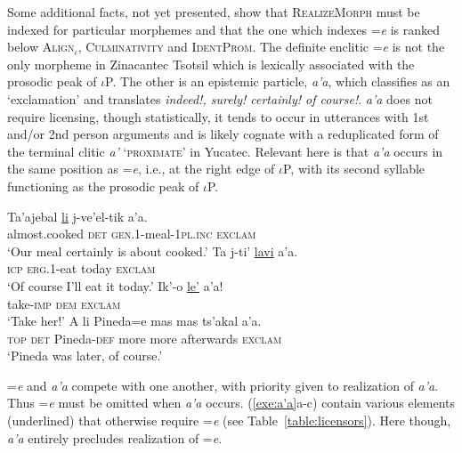 \documentclass[output=paper,
modfonts
]{LSP/langsci}
\begin{document}
Some additional facts, not yet presented, show that \textsc{RealizeMorph} must be indexed for particular morphemes and that
the one which indexes =\emph{e} is ranked below \textsc{Align$_{\iota}$}, \textsc{Culminativity} and  \textsc{IdentProm}.
The definite enclitic  =\emph{e} is
not the only morpheme in Zinacantec Tsotsil which is lexically associated with the prosodic peak of $\iota$P. 
The other is an epistemic particle, \emph{a'a}, which \citet{laughlin1975}
classifies as an `exclamation' and translates  \emph{indeed!, surely! certainly! of course!}. \emph{a'a} does not require licensing, though statistically, it tends to occur in utterances with 1st and/or 2nd person arguments and is likely cognate
with a reduplicated form of the terminal clitic \emph{a'} \textsc{`proximate'} in Yucatec.  
Relevant here is that \emph{a'a} occurs in the same position as =\emph{e}, i.e., at the right edge of
$\iota$P, with its second syllable functioning as the prosodic peak of $\iota$P. 
\begin{exe}
\ex
\begin{xlist}
\gll Ta'ajebal \underline{li} j-ve'el-tik a'a. \\
almost.cooked \textsc{det} \textsc{gen.1}-meal-\textsc{1pl.inc} \textsc{exclam} \\
\glt `Our meal certainly is about cooked.' \citep[285]{laughlin1977}
\gll Ta j-ti' \underline{lavi}  a'a.\\
\textsc{icp} \textsc{erg.1}-eat today \textsc{exclam}   \\
\glt  `Of course I'll eat it today.' \citep[283]{laughlin1977}
\gll Ik'-o \underline{le'} a'a! \\
take-\textsc{imp} \textsc{dem} \textsc{exclam} \\
\glt `Take her!' \citep[126]{laughlin1977}
\gll  A li Pineda=e mas mas ts'akal a'a. \\
\textsc{top} \textsc{det} Pineda-\textsc{def} more more afterwards  \textsc{exclam} \\
\glt `Pineda was later, of course.' \citep[116]{laughlin1977} 
\end{xlist}
\label{exe:a'a}
\end{exe}
=\emph{e} and \emph{a'a} compete
with one another, with priority given to realization of \emph{a'a}. Thus =\emph{e} must be omitted when \emph{a'a} occurs. 
 (\ref{exe:a'a}a-c) contain various elements
(underlined) that otherwise require =\emph{e} (see Table~\ref{table:licensors}). Here though, \emph{a'a} entirely precludes realization of =\emph{e}.
\end{document}
